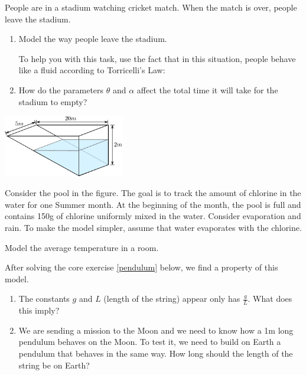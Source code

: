 \begin{exercises}
\begin{problist}
	\prob People are in a stadium watching cricket match. When the match is over, people leave the stadium. 
	
	\begin{enumerate}
	\item Model the way people leave the stadium.
	
	To help you with this task, use the fact that in this situation, people behave like a fluid according to Torricelli's Law:
	
		\begin{center}
		\end{center}

	\item How do the parameters $\theta$ and $\alpha$ affect the total time it will take for the stadium to empty?
	\end{enumerate}
	
	\begin{center}
		\includegraphics*[width=150pt]{images/module11-pool.pdf}
	\end{center}
	
	
	\prob Consider the pool in the figure. The goal is to track the amount of chlorine in the water for one Summer month. At the beginning of the month, the pool is full and contains 150g of chlorine uniformly mixed in the water. Consider evaporation and rain. To make the model simpler, assume that water evaporates with the chlorine.
	
	\prob Model the average temperature in a room.
	
	\prob After solving the core exercise \ref{pendulum} below, we find a property of this model. 
	\begin{enumerate}
		\item The constants $g$ and $L$ (length of the string) appear only has $\frac{g}{L}$. What does this imply?
		\item We are sending a mission to the Moon and we need to know how a 1m long pendulum behaves on the Moon. To test it, we need to build on Earth a pendulum that behaves in the same way. How long should the length of the string be on Earth?
	\end{enumerate}
	


\end{problist}
\end{exercises}
